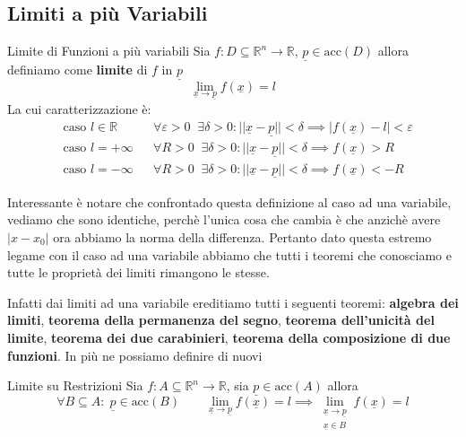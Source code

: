 \documentclass{rapport}
\begin{document}
\subsection{Limiti a più Variabili}
\begin{definizione}{Limite di Funzioni a più variabili}{}
  Sia $f:D\subseteq \mathbb{R}^n \to \mathbb{R}$, $\underline{p} \in \text{acc}(D)$ allora definiamo come \textbf{limite} di $f$ in $\underline{p}$ 
  \[
  \lim_{\underline{x} \to \underline{p}} f(\underline{x}) = l 
  \]
  La cui caratterizzazione è:
  \begin{align*}
    &\text{caso } l \in \mathbb{R} && \forall \varepsilon > 0\;\; \exists \delta > 0 : ||\underline{x} - \underline{p}|| < \delta \implies |f(\underline{x}) - l| < \varepsilon \\
    &\text{caso } l = +\infty && \forall R > 0\;\; \exists \delta > 0 : ||\underline{x} - \underline{p}|| < \delta \implies f(\underline{x}) > R \\
    &\text{caso } l = -\infty && \forall R > 0\;\; \exists \delta > 0 : ||\underline{x} - \underline{p}|| < \delta \implies f(\underline{x}) < -R
  \end{align*}
\end{definizione}

Interessante è notare che confrontado questa definizione  al caso ad una variabile, vediamo che sono identiche, perchè l'unica cosa che cambia è che anzichè avere $|x-x_0|$ ora abbiamo la norma della differenza. Pertanto dato questa estremo legame con il caso ad una variabile abbiamo che tutti i teoremi che conosciamo e tutte le proprietà dei limiti rimangono le stesse.

Infatti dai limiti ad una variabile ereditiamo tutti i seguenti teoremi: \textbf{algebra dei limiti}, \textbf{teorema della permanenza del segno}, \textbf{teorema dell'unicità del limite}, \textbf{teorema dei due carabinieri}, \textbf{teorema della composizione di due funzioni}. In più ne possiamo definire di nuovi

\begin{proposizione}{Limite su Restrizioni}{}
  Sia $f:A\subseteq \mathbb{R}^n \to \mathbb{R}$, sia $\underline{p} \in \text{acc}(A)$ allora 
  \[
  \forall B \subseteq A: \; \underline{p} \in \text{acc}(B) \qquad \lim_{\underline{x}\to\underline{p}} f(\underline{x}) = l \implies  \lim_{\substack{\underline{x}\to\underline{p} \\ \underline{x} \in B}} f(\underline{x}) = l
  \] 
\end{proposizione}
\end{document}

